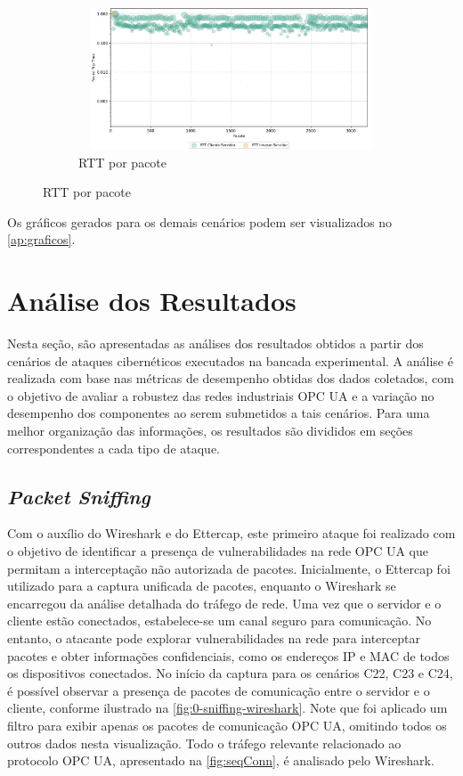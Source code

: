 \begin{figure}[htbp!]
\begin{subfigure}[t]{0.5\textwidth}
            \centering
            \caption{RTT por pacote}
            \includegraphics[width=1\textwidth, height=120pt]{USPSC-img/output/cropped/0-normal_local_server-rttp.png}
        \end{subfigure}%
    \end{figure}

    Os gráficos gerados para os demais cenários podem ser visualizados no \autoref{ap:graficos}.

\section{Análise dos Resultados} \label{sec:analise-resultados}

    Nesta seção, são apresentadas as análises dos resultados obtidos a partir dos cenários de ataques cibernéticos executados na bancada experimental. A análise é realizada com base nas métricas de desempenho obtidas dos dados coletados, com o objetivo de avaliar a robustez das redes industriais OPC UA e a variação no desempenho dos componentes ao serem submetidos a tais cenários. Para uma melhor organização das informações, os resultados são divididos em seções correspondentes a cada tipo de ataque.

    \subsection{\textit{Packet Sniffing}}

        Com o auxílio do Wireshark e do Ettercap, este primeiro ataque foi realizado com o objetivo de identificar a presença de vulnerabilidades na rede OPC UA que permitam a interceptação não autorizada de pacotes. Inicialmente, o Ettercap foi utilizado para a captura unificada de pacotes, enquanto o Wireshark se encarregou da análise detalhada do tráfego de rede. Uma vez que o servidor e o cliente estão conectados, estabelece-se um canal seguro para comunicação. No entanto, o atacante pode explorar vulnerabilidades na rede para interceptar pacotes e obter informações confidenciais, como os endereços IP e MAC de todos os dispositivos conectados. No início da captura para os cenários C22, C23 e C24, é possível observar a presença de pacotes de comunicação entre o servidor e o cliente, conforme ilustrado na \autoref{fig:0-sniffing-wireshark}. Note que foi aplicado um filtro para exibir apenas os pacotes de comunicação OPC UA, omitindo todos os outros dados nesta visualização. Todo o tráfego relevante relacionado ao protocolo OPC UA, apresentado na \autoref{fig:seqConn}, é analisado pelo Wireshark.

